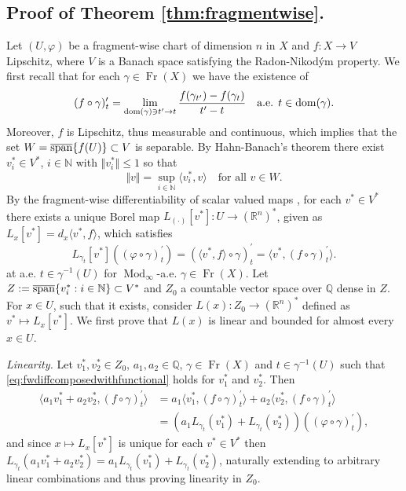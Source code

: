 \documentclass{amsart}
\numberwithin{equation}{section}
\newcommand{\R}{\mathbb{R}}
\newcommand{\Q}{\mathbb{Q}}
\newcommand{\N}{\mathbb{N}}
\newcommand{\Mod}{\operatorname{Mod}}
\newcommand{\dom}{\operatorname{dom}}
\newcommand{\Fr}{\operatorname{Fr}}
\begin{document}
\subsection{Proof of Theorem \ref{thm:fragmentwise}.}
Let $(U,\varphi )$ be a fragment-wise chart of dimension $n$ in $X$ and $f:X\rightarrow V$ Lipschitz, where $V$ is a Banach space satisfying the Radon-Nikodým property. We first recall that for each $\gamma\in \Fr (X)$ we have the existence of 
$$ (f\circ\gamma)_t'=\lim_{{\rm dom}(\gamma)\ni t'\to t}\frac{f(\gamma_{t'})-f(\gamma_t)}{t'-t}\quad \textrm{a.e. }t\in \dom(\gamma).$$ 
Moreover, $f$ is Lipschitz, thus measurable and continuous, which implies that the set $W=\overline{\rm span}\{ f(U) \}\subset V$ is separable. By Hahn-Banach's theorem there exist $v_i^*\in V^*$, $i\in\N$ with $\Vert v_i^*\Vert\leq 1$ so that
\begin{equation}\label{eq:hahnbanach}\Vert v\Vert =\sup_{i\in\N}\langle v_i^*,v\rangle\quad\text{for all } v\in W.
\end{equation}
By the fragment-wise differentiability of scalar valued maps \cite[Theorem 1.2]{tsd24}, for each $v^*\in V^*$ there exists a unique Borel map $L_{(\cdot )}[v^*]:U\rightarrow (\R^n)^*$, given as $L_x[v^*]=d_x\langle v^*, f\rangle$, which satisfies
\begin{equation}\label{eq:fwdiffcomposedwithfunctional}
	L_{\gamma_t}[v^*]((\varphi \circ\gamma)^\prime_t )=(\langle v^*,f\rangle \circ\gamma )^\prime_t=\langle v^*,(f\circ\gamma )^\prime_t\rangle .
\end{equation}
at a.e. $t\in \gamma^{-1}(U)$ for $\Mod_\infty$-a.e. $\gamma\in \Fr (X)$. Let $Z:=\overline{\rm span}\{ v_i^*:i\in\N\}\subset V^*$ and $Z_0$ a countable vector space over $\Q$ dense in $Z$. For $x\in U$, such that it exists, consider $L(x):Z_0\rightarrow (\R^n)^*$ defined as $v^*\mapsto L_x[v^*]$. We first prove that $L(x)$ is linear and bounded for almost every $x\in U$.

\textit{Linearity.} Let $v^*_{1},v^*_{2}\in Z_0$, $a_1,a_2\in\Q$, $\gamma\in \Fr(X)$ and $t\in \gamma^{-1}(U)$ such that \eqref{eq:fwdiffcomposedwithfunctional} holds for $v^*_{1}$ and $v^*_{2}$. Then
\begin{align*}
	\langle a_1v^*_{1}+a_2v^*_{2}, (f\circ\gamma )_t^\prime\rangle &= 
	a_1\langle v^*_{1}, (f\circ\gamma )_t^\prime\rangle +
	a_2\langle v^*_{2}, (f\circ\gamma )_t^\prime\rangle 
	\\
	&=(a_1L_{\gamma_t}(v^*_{1})+ L_{\gamma_t}(v^*_{2}))((\varphi\circ\gamma )_t^\prime ),
\end{align*}
and since $x\mapsto L_x[v^*]$ is unique for each $v^*\in V^*$ then $L_{\gamma_t}(a_1v^*_{1}+a_2v^*_{2})=a_1L_{\gamma_t}(v^*_1)+ L_{\gamma_t}(v^*_2)$, naturally extending to arbitrary linear combinations and thus proving linearity in $Z_0$.
\end{document}
